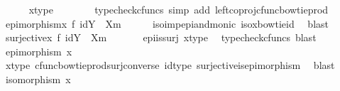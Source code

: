 \begin{isabellebody}
\ \ \ \ \isamarkupfalse%
\ x{\isacharunderscore}{\kern0pt}type\ \ \isanewline
\ \ \ \ \isamarkupfalse%
\ {\isacharparenleft}{\kern0pt}typecheck{\isacharunderscore}{\kern0pt}cfuncs{\isacharcomma}{\kern0pt}\ simp\ add{\isacharcolon}{\kern0pt}\ left{\isacharunderscore}{\kern0pt}coproj{\isacharunderscore}{\kern0pt}cfunc{\isacharunderscore}{\kern0pt}bowtie{\isacharunderscore}{\kern0pt}prod{\isacharparenright}{\kern0pt}\isanewline
\ \ \isamarkupfalse%
\ {\isachardoublequoteopen}epimorphism{\isacharparenleft}{\kern0pt}x\ {\isasymbowtie}\isactrlsub f\ id{\isacharparenleft}{\kern0pt}Y\ {\isasymsetminus}\ {\isacharparenleft}{\kern0pt}X{\isacharcomma}{\kern0pt}m{\isacharparenright}{\kern0pt}{\isacharparenright}{\kern0pt}{\isacharparenright}{\kern0pt}{\isachardoublequoteclose}\isanewline
\ \ \ \ \isamarkupfalse%
\ iso{\isacharunderscore}{\kern0pt}imp{\isacharunderscore}{\kern0pt}epi{\isacharunderscore}{\kern0pt}and{\isacharunderscore}{\kern0pt}monic\ iso{\isacharunderscore}{\kern0pt}x{\isacharunderscore}{\kern0pt}bowtie{\isacharunderscore}{\kern0pt}id\ \isamarkupfalse%
\ blast\isanewline
\ \ \isamarkupfalse%
\ \isamarkupfalse%
\ {\isachardoublequoteopen}surjective{\isacharparenleft}{\kern0pt}x\ {\isasymbowtie}\isactrlsub f\ id{\isacharparenleft}{\kern0pt}Y\ {\isasymsetminus}\ {\isacharparenleft}{\kern0pt}X{\isacharcomma}{\kern0pt}m{\isacharparenright}{\kern0pt}{\isacharparenright}{\kern0pt}{\isacharparenright}{\kern0pt}{\isachardoublequoteclose}\isanewline
\ \ \ \ \isamarkupfalse%
\ \ epi{\isacharunderscore}{\kern0pt}is{\isacharunderscore}{\kern0pt}surj\ x{\isacharunderscore}{\kern0pt}type\ \isamarkupfalse%
\ {\isacharparenleft}{\kern0pt}typecheck{\isacharunderscore}{\kern0pt}cfuncs{\isacharcomma}{\kern0pt}\ blast{\isacharparenright}{\kern0pt}\isanewline
\ \ \isamarkupfalse%
\ \isamarkupfalse%
\ {\isachardoublequoteopen}epimorphism\ x{\isachardoublequoteclose}\isanewline
\ \ \ \ \isamarkupfalse%
\ x{\isacharunderscore}{\kern0pt}type\ cfunc{\isacharunderscore}{\kern0pt}bowtieprod{\isacharunderscore}{\kern0pt}surj{\isacharunderscore}{\kern0pt}converse\ id{\isacharunderscore}{\kern0pt}type\ surjective{\isacharunderscore}{\kern0pt}is{\isacharunderscore}{\kern0pt}epimorphism\ \isamarkupfalse%
\ blast\isanewline
\ \ \isamarkupfalse%
\ \isamarkupfalse%
\ {\isachardoublequoteopen}isomorphism\ x{\isachardoublequoteclose}\isanewline

\end{isabellebody}
